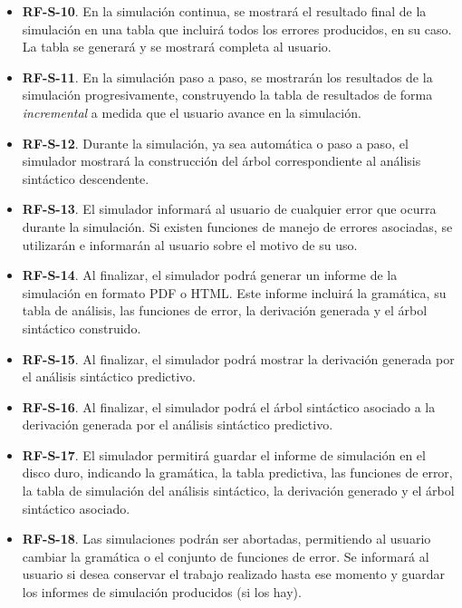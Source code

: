 \begin{itemize}
    \item \textbf{RF-S-10}. En la simulación continua, se mostrará el resultado final de la simulación en una tabla que incluirá todos los errores producidos, en su caso. La tabla se generará y se mostrará completa al usuario.

    \item \textbf{RF-S-11}. En la simulación paso a paso, se  mostrarán los resultados de la simulación progresivamente, construyendo la tabla de resultados de forma \textit{incremental} a medida que el usuario avance en la simulación.

    \item \textbf{RF-S-12}. Durante la simulación, ya sea automática o paso a paso, el simulador mostrará la construcción del árbol correspondiente al análisis sintáctico descendente.

    \item \textbf{RF-S-13}. El simulador informará al usuario de cualquier error que ocurra durante la simulación. Si existen funciones de manejo de errores asociadas, se utilizarán e informarán al usuario sobre el motivo de su uso.

    \item \textbf{RF-S-14}. Al finalizar, el simulador podrá generar un informe de la simulación en formato PDF o HTML. Este informe incluirá la gramática, su tabla de análisis, las funciones de error, la derivación generada y el árbol sintáctico construido.
    
    \item \textbf{RF-S-15}. Al finalizar, el simulador podrá mostrar la derivación generada por el análisis sintáctico predictivo.

    \item \textbf{RF-S-16}. Al finalizar, el simulador podrá el árbol sintáctico asociado a la derivación generada por el análisis sintáctico predictivo.

    \item \textbf{RF-S-17}. El simulador permitirá guardar el informe de simulación en el disco duro, indicando la gramática, la tabla predictiva,  las funciones de error, la tabla de simulación del análisis sintáctico, la derivación generado y el árbol sintáctico asociado.

    \item \textbf{RF-S-18}. Las simulaciones podrán ser abortadas, permitiendo al usuario cambiar la gramática o el conjunto de funciones de error. Se informará al usuario si desea conservar el trabajo realizado hasta ese momento y guardar los informes de simulación producidos (si los hay).
\end{itemize}



